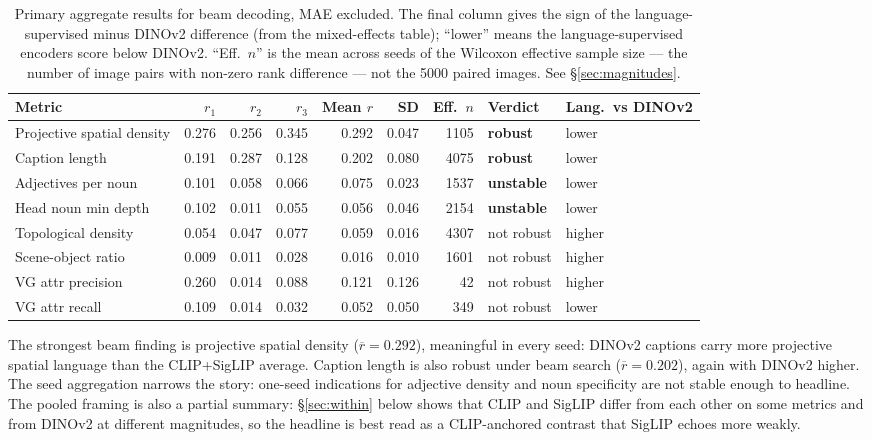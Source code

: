 \documentclass[11pt]{article}
\newcommand{\robust}{\textcolor{green!45!black}{\textbf{robust}}}
\newcommand{\unstable}{\textcolor{orange!70!black}{\textbf{unstable}}}
\newcommand{\notrobust}{\textcolor{gray!70!black}{not robust}}
\begin{document}
\begin{table}[!htbp]
\centering
\caption{Primary aggregate results for beam decoding, MAE excluded. The final
column gives the sign of the language-supervised minus DINOv2 difference (from
the mixed-effects table); ``lower'' means the language-supervised encoders
score below DINOv2. ``Eff.\ \(n\)'' is the mean across seeds of the Wilcoxon
effective sample size --- the number of image pairs with non-zero rank
difference --- not the 5000 paired images. See \S\ref{sec:magnitudes}.}
\label{tab:beam-primary}
\footnotesize
\begin{tabular}{@{}lrrrrrrll@{}}
\toprule
Metric & \(r_1\) & \(r_2\) & \(r_3\) & Mean \(r\) & SD & Eff.\ \(n\) & Verdict & Lang.\ vs DINOv2 \\
\midrule
Projective spatial density & 0.276 & 0.256 & 0.345 & 0.292 & 0.047 & 1105 & \robust & lower \\
Caption length & 0.191 & 0.287 & 0.128 & 0.202 & 0.080 & 4075 & \robust & lower \\
Adjectives per noun & 0.101 & 0.058 & 0.066 & 0.075 & 0.023 & 1537 & \unstable & lower \\
Head noun min depth & 0.102 & 0.011 & 0.055 & 0.056 & 0.046 & 2154 & \unstable & lower \\
Topological density & 0.054 & 0.047 & 0.077 & 0.059 & 0.016 & 4307 & \notrobust & higher \\
Scene-object ratio & 0.009 & 0.011 & 0.028 & 0.016 & 0.010 & 1601 & \notrobust & higher \\
VG attr precision & 0.260 & 0.014 & 0.088 & 0.121 & 0.126 & 42 & \notrobust & higher \\
VG attr recall & 0.109 & 0.014 & 0.032 & 0.052 & 0.050 & 349 & \notrobust & lower \\
\bottomrule
\end{tabular}
\end{table}

The strongest beam finding is projective spatial density
(\(\overline{r}=0.292\)), meaningful in every seed: DINOv2 captions carry more
projective spatial language than the CLIP+SigLIP average. Caption length is
also robust under beam search (\(\overline{r}=0.202\)), again with DINOv2
higher. The seed aggregation narrows the story: one-seed indications for
adjective density and noun specificity are not stable enough to headline.
The pooled framing is also a partial summary: \S\ref{sec:within} below shows
that CLIP and SigLIP differ from each other on some metrics and from DINOv2
at different magnitudes, so the headline is best read as a CLIP-anchored
contrast that SigLIP echoes more weakly.
\end{document}

